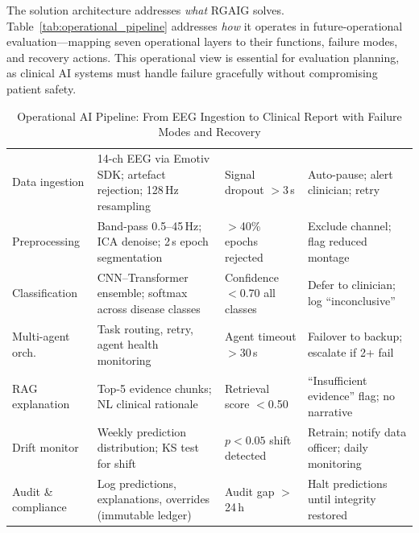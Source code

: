 The solution architecture addresses \textit{what} RGAIG solves. Table~\ref{tab:operational_pipeline} addresses \textit{how} it operates in future-operational evaluation---mapping seven operational layers to their functions, failure modes, and recovery actions. This operational view is essential for evaluation planning, as clinical AI systems must handle failure gracefully without compromising patient safety.

\begin{table}[H]
\tablestripes\tablefontsize
\tablefontsize
\caption[Operational AI Pipeline]{Operational AI Pipeline: From EEG Ingestion to Clinical Report with Failure Modes and Recovery}
\begin{tabularx}{\textwidth}{@{} >{\raggedright\arraybackslash}p{1.4cm} L L L @{}}
\toprule
{} &  &  &  \\
\midrule
Data ingestion & 14-ch EEG via Emotiv SDK; artefact rejection; 128\,Hz resampling & Signal dropout $>$3\,s & Auto-pause; alert clinician; retry \\
\addlinespace
Preprocessing & Band-pass 0.5--45\,Hz; ICA denoise; 2\,s epoch segmentation & $>$40\% epochs rejected & Exclude channel; flag reduced montage \\
\addlinespace
Classification & CNN--Transformer ensemble; softmax across disease classes & Confidence $<$0.70 all classes & Defer to clinician; log ``inconclusive'' \\
\addlinespace
Multi-agent orch. & Task routing, retry, agent health monitoring & Agent timeout $>$30\,s & Failover to backup; escalate if 2+ fail \\
\addlinespace
RAG explanation & Top-5 evidence chunks; NL clinical rationale & Retrieval score $<$0.50 & ``Insufficient evidence'' flag; no narrative \\
\addlinespace
Drift monitor & Weekly prediction distribution; KS test for shift & $p < 0.05$ shift detected & Retrain; notify data officer; daily monitoring \\
\addlinespace
Audit \& compliance & Log predictions, explanations, overrides (immutable ledger) & Audit gap $>$24\,h & Halt predictions until integrity restored \\
\bottomrule
\end{tabularx}
\end{table}

